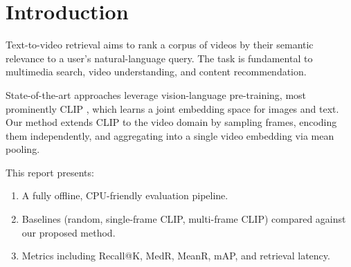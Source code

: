 \section{Introduction}
\label{sec:intro}

Text-to-video retrieval aims to rank a corpus of videos by their semantic relevance to a user's natural-language query.
The task is fundamental to multimedia search, video understanding, and content recommendation.

State-of-the-art approaches leverage vision-language pre-training, most prominently CLIP \cite{radford2021clip}, which learns a joint embedding space for images and text.
Our method extends CLIP to the video domain by sampling frames, encoding them independently, and aggregating into a single video embedding via mean pooling.

This report presents:
\begin{enumerate}
    \item A fully offline, CPU-friendly evaluation pipeline.
    \item Baselines (random, single-frame CLIP, multi-frame CLIP) compared against our proposed method.
    \item Metrics including Recall@K, MedR, MeanR, mAP, and retrieval latency.
\end{enumerate}
